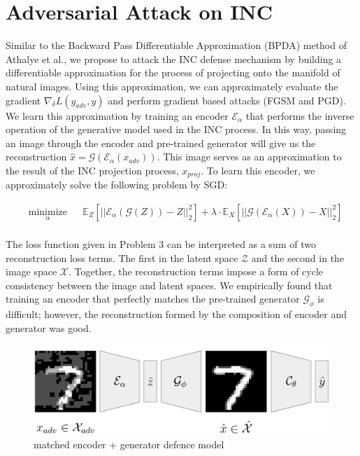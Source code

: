\documentclass[twoside]{article}
\theoremstyle{definition}
\begin{document}
\section{Adversarial Attack on INC}
Similar to the Backward Pass Differentiable Approximation (BPDA) method of Athalye et al., we propose to attack the INC defense mechanism by building a differentiable approximation for the process of projecting onto the manifold of natural images. Using this approximation, we can approximately evaluate the gradient $\nabla_{\delta} L(y_{adv},y) $ and perform gradient based attacks (FGSM and PGD). We learn this approximation by training an encoder  $\mathcal{E}_{\alpha}$ that performs the inverse operation of the generative model used in the INC process. In this way, passing an image through the encoder and pre-trained generator will give us the reconstruction $\hat{x} = \mathcal{G}(\mathcal{E}_{\alpha}(x_{adv}))$. This image serves as an approximation to the result of the INC projection process, $x_{proj}$. To learn this encoder, we approximately solve the following problem by SGD:

\begin{problem}
    \begin{equation*}
    \begin{aligned}
    & \underset{\alpha}{\text{minimize}}
    & & \mathbb{E}_{Z} [||\mathcal{E}_{\alpha}(\mathcal{G}(Z)) - Z||_2^2]
    + \lambda \cdot \mathbb{E}_{X} [||\mathcal{G}(\mathcal{E}_{\alpha}(X)) - X||_2^2]\\
    \end{aligned}
    \end{equation*}
\end{problem}

The loss function given in Problem 3 can be interpreted as a sum of two reconstruction loss terms. The first in the latent space $\mathcal{Z}$ and the second in the image space $\mathcal{X}$. Together, the reconstruction terms impose a form of cycle consistency between the image and latent spaces. We empirically found that training an encoder that perfectly matches the pre-trained generator $\mathcal{G}_{\phi}$ is difficult; however, the reconstruction formed by the composition of encoder and generator was good.

\begin{figure}[H]
    \caption{matched encoder + generator defence model}
\begin{center}
    \includegraphics[scale=0.3]{./INC.png}
\end{center}
\end{figure}
\end{document}
